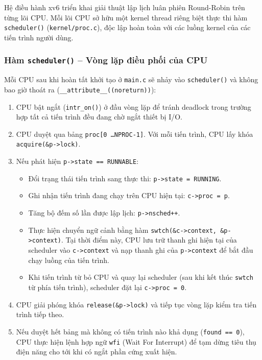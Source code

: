 Hệ điều hành xv6 triển khai giải thuật lập lịch luân phiên Round-Robin trên từng lõi CPU. Mỗi lõi CPU sở hữu một kernel thread riêng biệt thực thi hàm \texttt{scheduler()} (\texttt{kernel/proc.c}), độc lập hoàn toàn với các luồng kernel của các tiến trình người dùng.

\subsubsection{Hàm \texttt{scheduler()} -- Vòng lặp điều phối của CPU}
Mỗi CPU sau khi hoàn tất khởi tạo ở \texttt{main.c} sẽ nhảy vào \texttt{scheduler()} và không bao giờ thoát ra (\texttt{\_\_attribute\_\_((noreturn))}):
\begin{enumerate}
    \item CPU bật ngắt (\texttt{intr\_on()}) ở đầu vòng lặp để tránh deadlock trong trường hợp tất cả tiến trình đều đang chờ ngắt thiết bị I/O.
    \item CPU duyệt qua bảng \texttt{proc[0 \dots NPROC-1]}. Với mỗi tiến trình, CPU lấy khóa \texttt{acquire(\&p->lock)}.
    \item Nếu phát hiện \texttt{p->state == RUNNABLE}:
    \begin{itemize}
        \item Đổi trạng thái tiến trình sang thực thi: \texttt{p->state = RUNNING}.
        \item Ghi nhận tiến trình đang chạy trên CPU hiện tại: \texttt{c->proc = p}.
        \item Tăng bộ đếm số lần được lập lịch: \texttt{p->nsched++}.
        \item Thực hiện chuyển ngữ cảnh bằng hàm \texttt{swtch(\&c->context, \&p->context)}. Tại thời điểm này, CPU lưu trữ thanh ghi hiện tại của scheduler vào \texttt{c->context} và nạp thanh ghi của \texttt{p->context} để bắt đầu chạy luồng của tiến trình.
        \item Khi tiến trình từ bỏ CPU và quay lại scheduler (sau khi kết thúc \texttt{swtch} từ phía tiến trình), scheduler đặt lại \texttt{c->proc = 0}.
    \end{itemize}
    \item CPU giải phóng khóa \texttt{release(\&p->lock)} và tiếp tục vòng lặp kiểm tra tiến trình tiếp theo.
    \item Nếu duyệt hết bảng mà không có tiến trình nào khả dụng (\texttt{found == 0}), CPU thực hiện lệnh hợp ngữ \texttt{wfi} (Wait For Interrupt) để tạm dừng tiêu thụ điện năng cho tới khi có ngắt phần cứng xuất hiện.
\end{enumerate}

